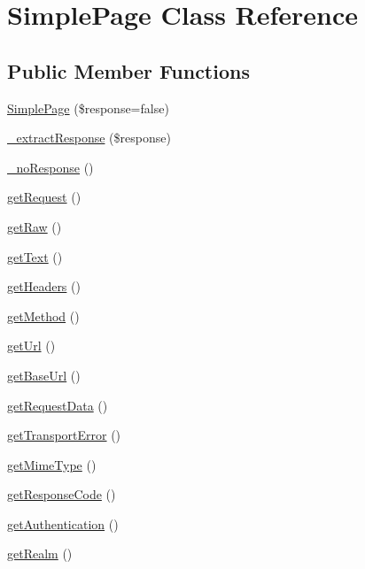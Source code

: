 \hypertarget{class_simple_page}{
\section{SimplePage Class Reference}
\label{class_simple_page}
}
\subsection*{Public Member Functions}
\begin{DoxyCompactItemize}
\item 
\hyperlink{class_simple_page_a0cb05e800a743639a3dcfe6bb7d0f67a}{SimplePage} (\$response=false)
\item 
\hyperlink{class_simple_page_acd294e7035f27eb2c333d22abc2a9f10}{\_\-extractResponse} (\$response)
\item 
\hyperlink{class_simple_page_a68568e98b615dd18e637a9e7d6cf49db}{\_\-noResponse} ()
\item 
\hyperlink{class_simple_page_a49e5532c77f862e152c7783d513b61f7}{getRequest} ()
\item 
\hyperlink{class_simple_page_a8a1e675f1751caf54c0f402cf16f1788}{getRaw} ()
\item 
\hyperlink{class_simple_page_aaf1c11cefece76fd17c7070649fc569b}{getText} ()
\item 
\hyperlink{class_simple_page_a93610bd4dd5bc00af5adc293704c4d8c}{getHeaders} ()
\item 
\hyperlink{class_simple_page_a315e80110ab689b07804a4cf93b019d3}{getMethod} ()
\item 
\hyperlink{class_simple_page_a380e54b3460541ec7d84d200b06cdd66}{getUrl} ()
\item 
\hyperlink{class_simple_page_a60f75babe73b4b88e1a22076090153b7}{getBaseUrl} ()
\item 
\hyperlink{class_simple_page_a3a6898f9e3df0e25b1d6595fa047138b}{getRequestData} ()
\item 
\hyperlink{class_simple_page_a2b66dc0883ae668bdcdbdf438fe5c852}{getTransportError} ()
\item 
\hyperlink{class_simple_page_ab45c7a21fad8a86bc92cf1c425d7aad9}{getMimeType} ()
\item 
\hyperlink{class_simple_page_a760bb3def2b63c94a828c00539db1268}{getResponseCode} ()
\item 
\hyperlink{class_simple_page_a043db55e5e4baa59bdb55636b28ae1c5}{getAuthentication} ()
\item 
\hyperlink{class_simple_page_a2805bd95c0dca213fd14f7dd96584616}{getRealm} ()

\end{DoxyCompactItemize}
